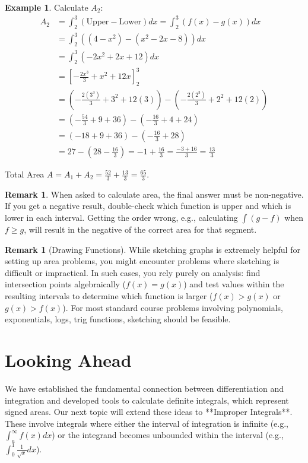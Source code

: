 \documentclass[11pt]{article}
\theoremstyle{definition}
\newtheorem{example}[theorem]{Example}
\newtheorem{remark}[theorem]{Remark}
\theoremstyle{remark} %
\begin{document}
\begin{example}
Calculate $A_2$:
\begin{align*} A_2 &= \int_2^3 (\text{Upper} - \text{Lower}) dx = \int_2^3 (f(x) - g(x)) dx \\ &= \int_2^3 ((4-x^2) - (x^2-2x-8)) dx \\ &= \int_2^3 (-2x^2 + 2x + 12) dx \\ &= \left[ -\frac{2x^3}{3} + x^2 + 12x \right]_2^3 \\ &= \left( -\frac{2(3^3)}{3} + 3^2 + 12(3) \right) - \left( -\frac{2(2^3)}{3} + 2^2 + 12(2) \right) \\ &= \left( -\frac{54}{3} + 9 + 36 \right) - \left( -\frac{16}{3} + 4 + 24 \right) \\ &= (-18 + 9 + 36) - (-\frac{16}{3} + 28) \\ &= 27 - (28 - \frac{16}{3}) = -1 + \frac{16}{3} = \frac{-3+16}{3} = \frac{13}{3} \end{align*}

Total Area $A = A_1 + A_2 = \frac{52}{3} + \frac{13}{3} = \frac{65}{3}$.

\begin{remark}
When asked to calculate area, the final answer must be non-negative. If you get a negative result, double-check which function is upper and which is lower in each interval. Getting the order wrong, e.g., calculating $\int (g-f)$ when $f \ge g$, will result in the negative of the correct area for that segment.
\end{remark}

\begin{remark}[Drawing Functions]
While sketching graphs is extremely helpful for setting up area problems, you might encounter problems where sketching is difficult or impractical. In such cases, you rely purely on analysis: find intersection points algebraically ($f(x)=g(x)$) and test values within the resulting intervals to determine which function is larger ($f(x) > g(x)$ or $g(x) > f(x)$). For most standard course problems involving polynomials, exponentials, logs, trig functions, sketching should be feasible.
\end{remark}
\end{example}


\section{Looking Ahead}

We have established the fundamental connection between differentiation and integration and developed tools to calculate definite integrals, which represent signed areas. Our next topic will extend these ideas to **Improper Integrals**. These involve integrals where either the interval of integration is infinite (e.g., $\int_a^\infty f(x) dx$) or the integrand becomes unbounded within the interval (e.g., $\int_0^1 \frac{1}{\sqrt{x}} dx$).
\end{document}
